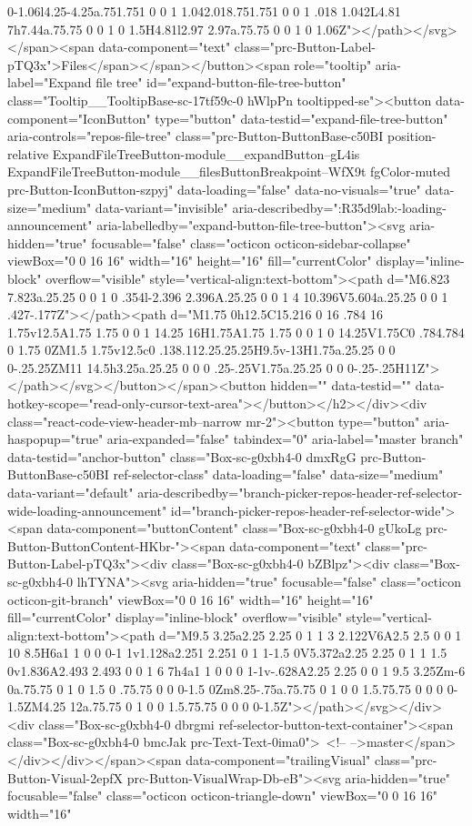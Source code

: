 {{{{{{{{{{{{{{{{{{{{{{{{{{{{{{{0-1.06l4.25-4.25a.751.751 0 0 1 1.042.018.751.751 0 0 1 .018 1.042L4.81 7h7.44a.75.75 0 0 1 0 1.5H4.81l2.97 2.97a.75.75 0 0 1 0 1.06Z"></path></svg></span><span data-component="text" class="prc-Button-Label-pTQ3x">Files</span></span></button><span role="tooltip" aria-label="Expand file tree" id="expand-button-file-tree-button" class="Tooltip__TooltipBase-sc-17tf59c-0 hWlpPn tooltipped-se"><button data-component="IconButton" type="button" data-testid="expand-file-tree-button" aria-controls="repos-file-tree" class="prc-Button-ButtonBase-c50BI position-relative ExpandFileTreeButton-module__expandButton--gL4is ExpandFileTreeButton-module__filesButtonBreakpoint--WfX9t fgColor-muted prc-Button-IconButton-szpyj" data-loading="false" data-no-visuals="true" data-size="medium" data-variant="invisible" aria-describedby=":R35d9lab:-loading-announcement" aria-labelledby="expand-button-file-tree-button"><svg aria-hidden="true" focusable="false" class="octicon octicon-sidebar-collapse" viewBox="0 0 16 16" width="16" height="16" fill="currentColor" display="inline-block" overflow="visible" style="vertical-align:text-bottom"><path d="M6.823 7.823a.25.25 0 0 1 0 .354l-2.396 2.396A.25.25 0 0 1 4 10.396V5.604a.25.25 0 0 1 .427-.177Z"></path><path d="M1.75 0h12.5C15.216 0 16 .784 16 1.75v12.5A1.75 1.75 0 0 1 14.25 16H1.75A1.75 1.75 0 0 1 0 14.25V1.75C0 .784.784 0 1.75 0ZM1.5 1.75v12.5c0 .138.112.25.25.25H9.5v-13H1.75a.25.25 0 0 0-.25.25ZM11 14.5h3.25a.25.25 0 0 0 .25-.25V1.75a.25.25 0 0 0-.25-.25H11Z"></path></svg></button></span><button hidden="" data-testid="" data-hotkey-scope="read-only-cursor-text-area"></button></h2></div><div class="react-code-view-header-mb--narrow mr-2"><button type="button" aria-haspopup="true" aria-expanded="false" tabindex="0" aria-label="master branch" data-testid="anchor-button" class="Box-sc-g0xbh4-0 dmxRgG prc-Button-ButtonBase-c50BI ref-selector-class" data-loading="false" data-size="medium" data-variant="default" aria-describedby="branch-picker-repos-header-ref-selector-wide-loading-announcement" id="branch-picker-repos-header-ref-selector-wide"><span data-component="buttonContent" class="Box-sc-g0xbh4-0 gUkoLg prc-Button-ButtonContent-HKbr-"><span data-component="text" class="prc-Button-Label-pTQ3x"><div class="Box-sc-g0xbh4-0 bZBlpz"><div class="Box-sc-g0xbh4-0 lhTYNA"><svg aria-hidden="true" focusable="false" class="octicon octicon-git-branch" viewBox="0 0 16 16" width="16" height="16" fill="currentColor" display="inline-block" overflow="visible" style="vertical-align:text-bottom"><path d="M9.5 3.25a2.25 2.25 0 1 1 3 2.122V6A2.5 2.5 0 0 1 10 8.5H6a1 1 0 0 0-1 1v1.128a2.251 2.251 0 1 1-1.5 0V5.372a2.25 2.25 0 1 1 1.5 0v1.836A2.493 2.493 0 0 1 6 7h4a1 1 0 0 0 1-1v-.628A2.25 2.25 0 0 1 9.5 3.25Zm-6 0a.75.75 0 1 0 1.5 0 .75.75 0 0 0-1.5 0Zm8.25-.75a.75.75 0 1 0 0 1.5.75.75 0 0 0 0-1.5ZM4.25 12a.75.75 0 1 0 0 1.5.75.75 0 0 0 0-1.5Z"></path></svg></div><div class="Box-sc-g0xbh4-0 dbrgmi ref-selector-button-text-container"><span class="Box-sc-g0xbh4-0 bmcJak prc-Text-Text-0ima0"> <!-- -->master</span></div></div></span><span data-component="trailingVisual" class="prc-Button-Visual-2epfX prc-Button-VisualWrap-Db-eB"><svg aria-hidden="true" focusable="false" class="octicon octicon-triangle-down" viewBox="0 0 16 16" width="16" }}}}}}}}}}}}}}}}}}}}}}}}}}}}}}}
